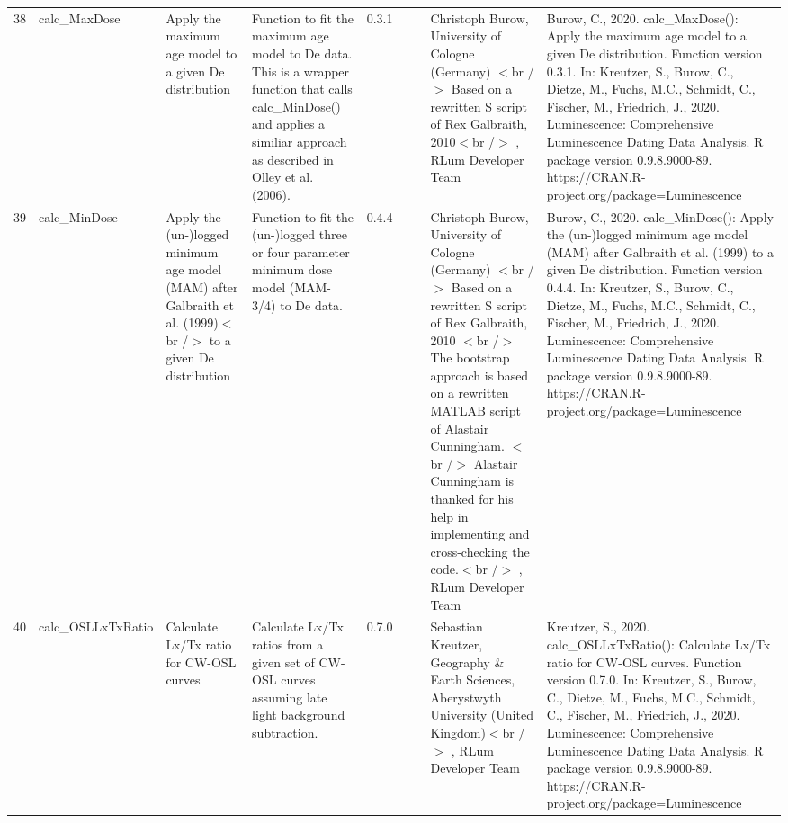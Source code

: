 \begin{table}[ht]
\begin{tabular}{rllllllll}
 \\ 
  38 & calc\_MaxDose & Apply the maximum age model to a given De distribution & Function to fit the maximum age model to De data. This is a wrapper function that calls calc\_MinDose() and applies a similiar approach as described in Olley et al. (2006). & 0.3.1
 &  &  & Christoph Burow, University of Cologne (Germany)  $<$br /$>$ Based on a rewritten S script of Rex Galbraith, 2010$<$br /$>$ , RLum Developer Team & Burow, C., 2020. calc\_MaxDose(): Apply the maximum age model to a given De distribution. Function version 0.3.1. In: Kreutzer, S., Burow, C., Dietze, M., Fuchs, M.C., Schmidt, C., Fischer, M., Friedrich, J., 2020. Luminescence: Comprehensive Luminescence Dating Data Analysis. R package version 0.9.8.9000-89. https://CRAN.R-project.org/package=Luminescence
 \\ 
  39 & calc\_MinDose & Apply the (un-)logged minimum age model (MAM) after Galbraith et al. (1999)$<$br /$>$ to a given De distribution & Function to fit the (un-)logged three or four parameter minimum dose model (MAM-3/4) to De data. & 0.4.4
 &  &  & Christoph Burow, University of Cologne (Germany)  $<$br /$>$ Based on a rewritten S script of Rex Galbraith, 2010  $<$br /$>$ The bootstrap approach is based on a rewritten MATLAB script of Alastair Cunningham.  $<$br /$>$ Alastair Cunningham is thanked for his help in implementing and cross-checking the code.$<$br /$>$ , RLum Developer Team & Burow, C., 2020. calc\_MinDose(): Apply the (un-)logged minimum age model (MAM) after Galbraith et al. (1999) to a given De distribution. Function version 0.4.4. In: Kreutzer, S., Burow, C., Dietze, M., Fuchs, M.C., Schmidt, C., Fischer, M., Friedrich, J., 2020. Luminescence: Comprehensive Luminescence Dating Data Analysis. R package version 0.9.8.9000-89. https://CRAN.R-project.org/package=Luminescence
 \\ 
  40 & calc\_OSLLxTxRatio & Calculate  Lx/Tx  ratio for CW-OSL curves & Calculate  Lx/Tx  ratios from a given set of CW-OSL curves assuming late light background subtraction. & 0.7.0
 &  &  & Sebastian Kreutzer, Geography \& Earth Sciences, Aberystwyth University (United Kingdom)$<$br /$>$ , RLum Developer Team & Kreutzer, S., 2020. calc\_OSLLxTxRatio(): Calculate Lx/Tx ratio for CW-OSL curves. Function version 0.7.0. In: Kreutzer, S., Burow, C., Dietze, M., Fuchs, M.C., Schmidt, C., Fischer, M., Friedrich, J., 2020. Luminescence: Comprehensive Luminescence Dating Data Analysis. R package version 0.9.8.9000-89. https://CRAN.R-project.org/package=Luminescence
 \\ 

\end{tabular}
\end{table}
